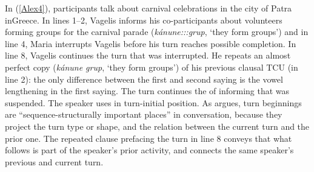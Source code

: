 \documentclass[output=paper]{LSP/langsci}
\begin{document}
In (\ref{Alex4}), participants talk about carnival celebrations in the city of Patra in\linebreak Greece. In lines 1--2, Vagelis informs his co-participants about volunteers forming groups for the carnival parade (\textit{kánune:::grup}, `they form groups') and in line 4, Maria interrupts Vagelis before his turn reaches possible completion. In line 8, Vagelis continues the turn that was interrupted. He repeats an almost perfect copy (\textit{kánune grup}, `they form groups') of his previous clausal TCU (in line 2): the only difference between the first and second saying is the vowel lengthening in the first saying. The turn continues the  of informing that was suspended. The speaker uses  in turn-initial position. As \citet[][72]{schegloff87} argues, turn beginnings are ``sequence-structurally important places'' in conversation, because they project the turn type or shape, and the relation between the current turn and the prior one. The repeated clause prefacing the turn in line 8 conveys that what follows is part of the speaker’s prior activity, and connects the same speaker’s previous and current turn.
\end{document}
